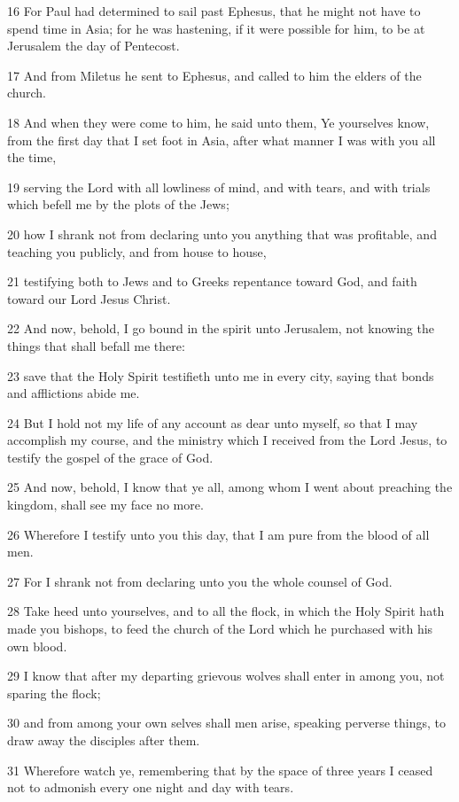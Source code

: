 \par 16 For Paul had determined to sail past Ephesus, that he might not have to spend time in Asia; for he was hastening, if it were possible for him, to be at Jerusalem the day of Pentecost.
\par 17 And from Miletus he sent to Ephesus, and called to him the elders of the church.
\par 18 And when they were come to him, he said unto them, Ye yourselves know, from the first day that I set foot in Asia, after what manner I was with you all the time,
\par 19 serving the Lord with all lowliness of mind, and with tears, and with trials which befell me by the plots of the Jews;
\par 20 how I shrank not from declaring unto you anything that was profitable, and teaching you publicly, and from house to house,
\par 21 testifying both to Jews and to Greeks repentance toward God, and faith toward our Lord Jesus Christ.
\par 22 And now, behold, I go bound in the spirit unto Jerusalem, not knowing the things that shall befall me there:
\par 23 save that the Holy Spirit testifieth unto me in every city, saying that bonds and afflictions abide me.
\par 24 But I hold not my life of any account as dear unto myself, so that I may accomplish my course, and the ministry which I received from the Lord Jesus, to testify the gospel of the grace of God.
\par 25 And now, behold, I know that ye all, among whom I went about preaching the kingdom, shall see my face no more.
\par 26 Wherefore I testify unto you this day, that I am pure from the blood of all men.
\par 27 For I shrank not from declaring unto you the whole counsel of God.
\par 28 Take heed unto yourselves, and to all the flock, in which the Holy Spirit hath made you bishops, to feed the church of the Lord which he purchased with his own blood.
\par 29 I know that after my departing grievous wolves shall enter in among you, not sparing the flock;
\par 30 and from among your own selves shall men arise, speaking perverse things, to draw away the disciples after them.
\par 31 Wherefore watch ye, remembering that by the space of three years I ceased not to admonish every one night and day with tears.
